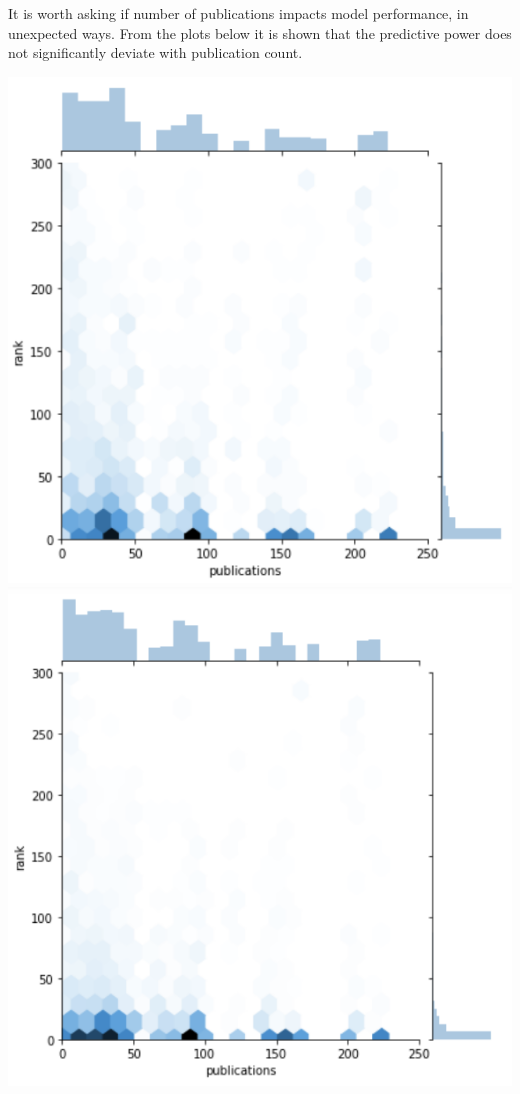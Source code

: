 \documentclass{article}
\begin{document}
\begin{multicols}{2}
It is worth asking if number of publications impacts model performance,
in unexpected ways. From the plots below it is shown that the predictive power
does not significantly deviate with publication count.

\includegraphics[width=\columnwidth]{../images/Test_pubs.png}
\includegraphics[width=\columnwidth]{../images/Train_pubs.png}


\end{multicols}
\end{document}
